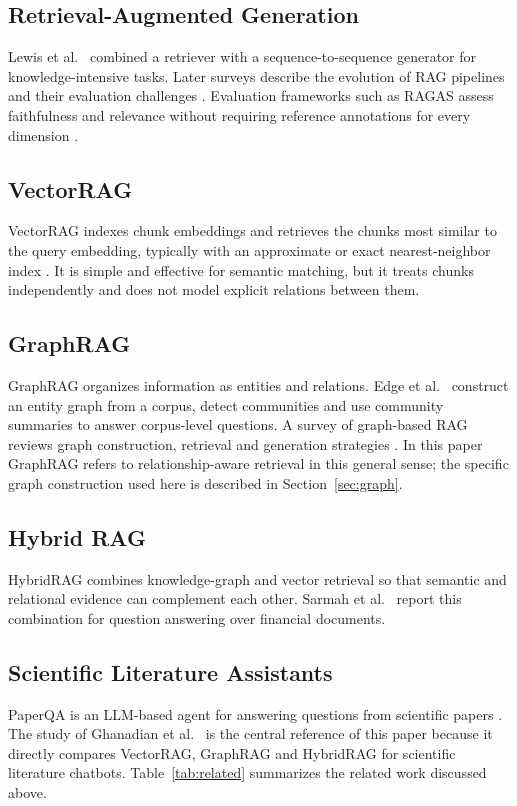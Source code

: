 \documentclass[conference]{IEEEtran}
\begin{document}
\subsection{Retrieval-Augmented Generation}
Lewis et al.\ \cite{lewis2020rag} combined a retriever with a sequence-to-sequence generator for knowledge-intensive tasks. Later surveys describe the evolution of RAG pipelines and their evaluation challenges \cite{gao2023ragsurvey}. Evaluation frameworks such as RAGAS assess faithfulness and relevance without requiring reference annotations for every dimension \cite{es2024ragas}.

\subsection{VectorRAG}
VectorRAG indexes chunk embeddings and retrieves the chunks most similar to the query embedding, typically with an approximate or exact nearest-neighbor index \cite{johnson2021faiss}. It is simple and effective for semantic matching, but it treats chunks independently and does not model explicit relations between them.

\subsection{GraphRAG}
GraphRAG organizes information as entities and relations. Edge et al.\ \cite{edge2024graphrag} construct an entity graph from a corpus, detect communities and use community summaries to answer corpus-level questions. A survey of graph-based RAG reviews graph construction, retrieval and generation strategies \cite{peng2024graphragsurvey}. In this paper GraphRAG refers to relationship-aware retrieval in this general sense; the specific graph construction used here is described in Section~\ref{sec:graph}.

\subsection{Hybrid RAG}
HybridRAG combines knowledge-graph and vector retrieval so that semantic and relational evidence can complement each other. Sarmah et al.\ \cite{sarmah2024hybridrag} report this combination for question answering over financial documents.

\subsection{Scientific Literature Assistants}
PaperQA is an LLM-based agent for answering questions from scientific papers \cite{lala2023paperqa}. The study of Ghanadian et al.\ \cite{ghanadian2026base} is the central reference of this paper because it directly compares VectorRAG, GraphRAG and HybridRAG for scientific literature chatbots. Table~\ref{tab:related} summarizes the related work discussed above.
\end{document}
